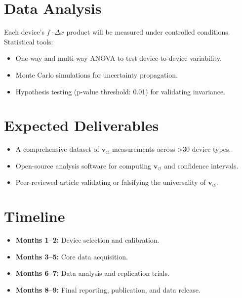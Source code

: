         \section*{Data Analysis}
        Each device's \( f \cdot \Delta x \) product will be measured under controlled conditions. Statistical tools:
        \begin{itemize}
            \item One-way and multi-way ANOVA to test device-to-device variability.
            \item Monte Carlo simulations for uncertainty propagation.
            \item Hypothesis testing (p-value threshold: 0.01) for validating invariance.
        \end{itemize}

        \section*{Expected Deliverables}
        \begin{itemize}
            \item A comprehensive dataset of \( \mathbf{v}_{\scriptscriptstyle\boldsymbol{\circlearrowleft}} \) measurements across >30 device types.
            \item Open-source analysis software for computing \( \mathbf{v}_{\scriptscriptstyle\boldsymbol{\circlearrowleft}} \) and confidence intervals.
            \item Peer-reviewed article validating or falsifying the universality of \( \mathbf{v}_{\scriptscriptstyle\boldsymbol{\circlearrowleft}} \).
        \end{itemize}

        \section*{Timeline}
        \begin{itemize}
            \item \textbf{Months 1–2:} Device selection and calibration.
            \item \textbf{Months 3–5:} Core data acquisition.
            \item \textbf{Months 6–7:} Data analysis and replication trials.
            \item \textbf{Months 8–9:} Final reporting, publication, and data release.
        \end{itemize}

